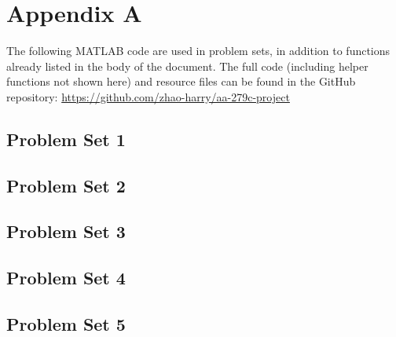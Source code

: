\appendix

\section{Appendix A}
The following MATLAB code are used in problem sets, in addition to functions already listed in the body of the document. The full code (including helper functions not shown here) and resource files can be found in the GitHub repository: \url{https://github.com/zhao-harry/aa-279c-project}

\subsection{Problem Set 1}


\newpage
\subsection{Problem Set 2}








\newpage
\subsection{Problem Set 3}



\newpage
\subsection{Problem Set 4}


\newpage
\subsection{Problem Set 5}





